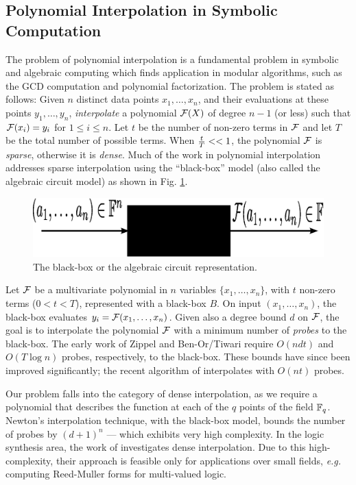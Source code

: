 \subsection{Polynomial Interpolation in Symbolic Computation}

The problem of polynomial interpolation is a fundamental problem in
symbolic and algebraic computing which finds application in modular
algorithms, such as the GCD computation and polynomial
factorization. The problem is stated as follows: Given $n$ distinct
data points $x_1, \dots, x_n$, and their evaluations at these points
$y_1, \dots, y_n$,  {\it interpolate} a polynomial ${\mathcal{F}}(X)$ of degree
$n-1$ (or less) such that ${\mathcal{F}}(x_i) = y_i$ for $1 \leq i \leq n$. 
Let $t$ be the number of non-zero terms in ${\mathcal{F}}$ and let $T$ be the
total number of possible terms. When ${{t} \over {T}} << 1$, the
polynomial ${\mathcal{F}}$ is {\it sparse}, otherwise it is {\it dense}. Much of
the work in polynomial interpolation addresses sparse 
interpolation using the ``black-box'' model (also called the
algebraic circuit model) as shown in Fig. \ref{fig:blackbox}. 

\begin{figure}[hbt]
\centerline{
\includegraphics[scale=0.45]{blackbox.eps}
}
\caption{The black-box or the algebraic circuit representation.}
\label{fig:blackbox}
\end{figure}

Let ${\mathcal{F}}$ be a multivariate polynomial in $n$ variables $\{x_1, \dots,
x_n\}$, with $t$ non-zero terms ($0 < t < T$), represented with a
black-box $B$. On input $(x_1, \dots, x_n)$,
the black-box evaluates $y_i = {\mathcal{F}}(x_1, \dots, x_n)$. Given also a
degree bound $d$ on ${\mathcal{F}}$, the goal is to interpolate the polynomial
${\mathcal{F}}$ with a minimum number of {\it probes} to the black-box. The early
work of Zippel \cite{zippel:interpolate} and
Ben-Or/Tiwari \cite{ben-or-tiwari:interpolate} require $O(ndt)$ and
$O(T \log n)$ probes, respectively, to the black-box. These bounds
have since been improved significantly; the recent algorithm of
\cite{monagan:interpolate} interpolates with $O(nt)$ probes.  

Our problem falls into the category of dense interpolation, as we
require a polynomial that describes the function at each of the $q$
points of the field ${\mathbb{F}}_{q}$. Newton's interpolation technique, with the
black-box model, bounds the number of probes by $(d+1)^n$ --- which 
exhibits very high complexity. In the logic synthesis area, the work of
\cite{zilic:interpolate} investigates dense interpolation. Due to this
high-complexity, their approach is feasible only for applications over
small fields, {\it e.g.} computing  Reed-Muller forms for multi-valued
logic.  

